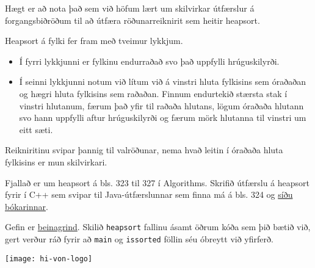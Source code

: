 \documentclass{article}
\begin{document}
\question

Hægt er að nota það sem við höfum lært um skilvirkar útfærslur á forgangsbiðröðum til að útfæra röðunarreiknirit sem heitir heapsort.

Heapsort á fylki fer fram með tveimur lykkjum.

\begin{itemize}
	\item Í fyrri lykkjunni er fylkinu endurraðað svo það uppfylli hrúguskilyrði.

	\item Í seinni lykkjunni notum við lítum við á vinstri hluta fylkisins sem óraðaðan og hægri hluta fylkisins sem raðaðan. Finnum endurtekið stærsta stak í vinstri hlutanum, færum það yfir til raðaða hlutans, lögum óraðaða hlutann svo hann uppfylli aftur hrúguskilyrði og færum mörk hlutanna til vinstri um eitt sæti.
\end{itemize}
Reikniritinu svipar þannig til valröðunar, nema hvað leitin í óraðaða hluta fylkisins er mun skilvirkari.

Fjallað er um heapsort á bls. 323 til 327 í Algorithms. Skrifið útfærslu á heapsort fyrir í C++ sem svipar til Java-útfærslunnar sem finna má á bls. 324 og \href{https://algs4.cs.princeton.edu/code/edu/princeton/cs/algs4/Heap.java.html}{síðu bókarinnar}.

Gefin er \href{https://raw.githubusercontent.com/Ernir/kennsluefni/master/T2/Code/w9/heapsort.cpp}{beinagrind}. Skilið \texttt{heapsort} fallinu ásamt öðrum kóða sem þið bætið við, gert verður ráð fyrir að \texttt{main} og \texttt{issorted} föllin séu óbreytt við yfirferð.

\vfill
\texttt{[image: hi-von-logo]}
\end{document}
